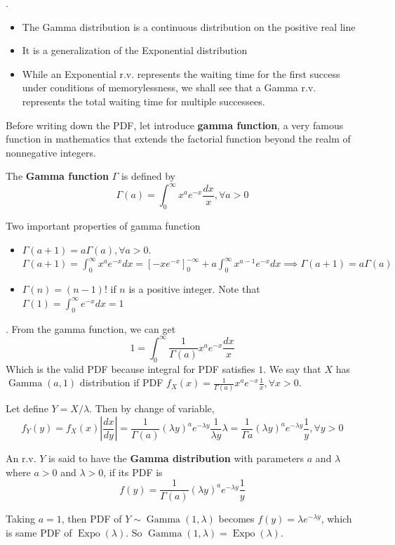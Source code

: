 \documentclass[8pt]{beamer}
\newcommand{\tb}[1]{\textbf{#1}}
\newcommand{\Expo}[1]{\operatorname{Expo}\!\left(#1\right)}
\newcommand{\abs}[1]{\left\lvert #1 \right\rvert}
\newcommand{\GammaDist}[2]{\operatorname{Gamma}\!\left(#1, #2\right)}
\begin{document}
\begin{frame}{.}
    \begin{itemize}
        \item The Gamma distribution is a continuous distribution on the positive real line
        \item It is a generalization of the Exponential distribution
        \item While an Exponential r.v. represents the waiting time for the first success under conditions of memorylessness, we shall see that a Gamma r.v. represents the total waiting time for multiple successees.
    \end{itemize}

    Before writing down the PDF, let introduce \tb{gamma function}, a very famous function in mathematics that extends the factorial function beyond the realm of nonnegative integers.

    \begin{definition}
        The \tb{Gamma function} $\Gamma$ is defined by
        \[
            \Gamma(a) = \int_0^\infty x^a e^{-x} \frac{dx}{x}, \forall a > 0
        \]
    \end{definition}

    Two important properties of gamma function
    \begin{itemize}
        \item $\Gamma(a+1) = a \Gamma(a), \forall a > 0$. $\Gamma(a+1) = \int_0^\infty x^a e^{-x} dx = \left[-x e^{-x}\right]^{-\infty}_0 + a \int_0^\infty x^{a-1} e^{-x} dx  \implies \Gamma(a+1) = a \Gamma(a)$
        \item $\Gamma(n) = (n-1)!$ if $n$ is a positive integer. Note that $\Gamma(1) = \int_0^\infty e^{-x} dx = 1$
    \end{itemize}
\end{frame}

\begin{frame}{.}
    From the gamma function, we can get
    \[
        1 = \int_{0}^{\infty} \frac{1}{\Gamma(a)} x^a e^{-x} \frac{dx}{x}
    \]
    Which is the valid PDF because integral for PDF satisfies $1$. We say that $X$ has $\GammaDist{a}{1}$ distribution if PDF $f_X(x) = \frac{1}{\Gamma(a)} x^{a}e^{-x}\frac{1}{x}, \forall x>0$.

    Let define $Y = X / \lambda$. Then by change of variable, 
    \[
        f_Y(y) = f_X(x) \abs{\frac{dx}{dy}} = \frac{1}{\Gamma(a)} (\lambda y)^a e^{-\lambda y} \frac{1}{\lambda y} \lambda = \frac{1}{\Gamma{a}} (\lambda y)^a e^{-\lambda y} \frac{1}{y}, \forall y >0
    \]

    \begin{definition}
        An r.v. $Y$ is said to have the \tb{Gamma distribution} with parameters $a$ and $\lambda$ where $a >0$ and $\lambda >0$, if its PDF is
        \[
            f(y) = \frac{1}{\Gamma(a)} (\lambda y)^a e^{-\lambda y} \frac{1}{y}
        \]
    \end{definition}

    Taking $a=1$, then PDF of $Y \sim \GammaDist{1}{\lambda}$ becomes $f(y) = \lambda e^{-\lambda y}$, which is same PDF of $\Expo{\lambda}$. So $\GammaDist{1}{\lambda} = \Expo{\lambda}$.
\end{frame}
\end{document}
